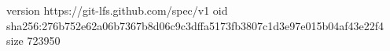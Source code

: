 version https://git-lfs.github.com/spec/v1
oid sha256:276b752e62a06b7367b8d06c9c3dffa5173fb3807c1d3e97e015b04af43e22f4
size 723950

